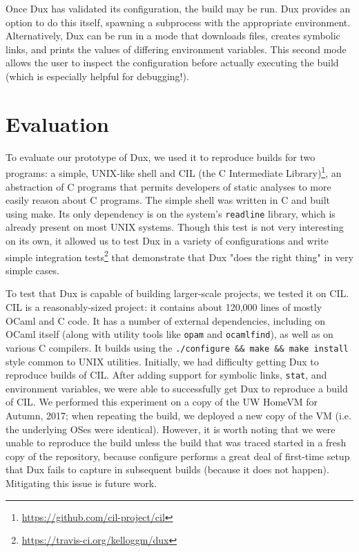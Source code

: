 \documentclass[10pt,conference]{IEEEtran}
\begin{document}
Once Dux has validated its configuration, the build may be run. Dux provides an option to do this itself, spawning
a subprocess with the appropriate environment. Alternatively, Dux can be run in a mode that downloads files,
creates symbolic links, and prints the values of differing environment variables. This second mode allows the user
to inspect the configuration before actually executing the build (which is especially helpful for debugging!).

\section{Evaluation}

To evaluate our prototype of Dux, we used it to reproduce builds for two programs: a simple, UNIX-like shell and
CIL (the C Intermediate Library)\footnote{\url{https://github.com/cil-project/cil}}, an abstraction of C programs
that permits developers of static analyses to more easily reason about C programs. The simple shell was written in
C and built using make. Its only dependency is on the system's \texttt{readline} library, which is already
present on most UNIX systems. Though this test is not very interesting on its own, it allowed us to test Dux in
a variety of configurations and write simple integration tests\footnote{\url{https://travis-ci.org/kelloggm/dux}}
that demonstrate that Dux "does the right thing" in very simple cases.

To test that Dux is capable of building larger-scale projects, we tested it on CIL. CIL is a reasonably-sized
project: it contains about 120,000 lines of mostly OCaml and C code. It has a number of external dependencies,
including on OCaml itself (along with utility tools like \texttt{opam} and \texttt{ocamlfind}), as well as on
various C compilers. It builds using the \texttt{./configure \&\& make \&\& make install} style common to UNIX
utilities. Initially, we had difficulty getting Dux to reproduce builds of CIL. After adding support for symbolic
links, \texttt{stat}, and environment variables, we were able to successfully get Dux to reproduce a build of CIL.
We performed this experiment on a copy of the UW HomeVM for Autumn, 2017; when repeating the build, we deployed
a new copy of the VM (i.e. the underlying OSes were identical). However, it is worth noting that we were unable
to reproduce the build unless the build that was traced started in a fresh copy of the repository, because
configure performs a great deal of first-time setup that Dux fails to capture in subsequent builds (because it
does not happen). Mitigating this issue is future work.
\end{document}
